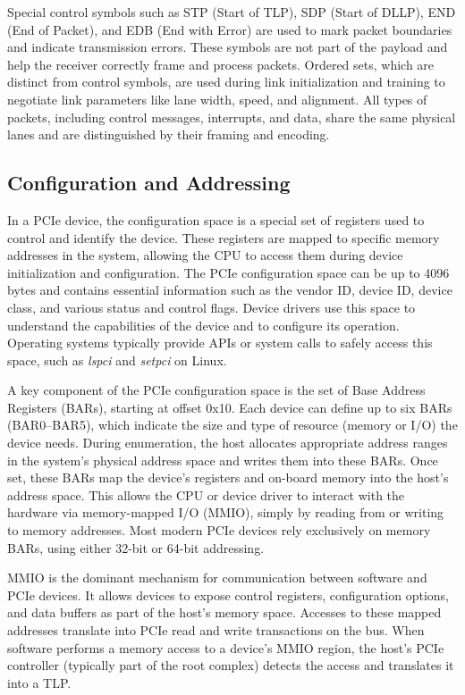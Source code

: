 Special control symbols such as STP (Start of TLP), SDP (Start of DLLP), END (End of Packet), and EDB (End with Error) are used to mark packet boundaries and indicate transmission errors. These symbols are not part of the payload and help the receiver correctly frame and process packets. Ordered sets, which are distinct from control symbols, are used during link initialization and training to negotiate link parameters like lane width, speed, and alignment. All types of packets, including control messages, interrupts, and data, share the same physical lanes and are distinguished by their framing and encoding.

\subsection{Configuration and Addressing}

In a PCIe device, the configuration space is a special set of registers used to control and identify the device. These registers are mapped to specific memory addresses in the system, allowing the CPU to access them during device initialization and configuration. The PCIe configuration space can be up to 4096 bytes and contains essential information such as the vendor ID, device ID, device class, and various status and control flags. Device drivers use this space to understand the capabilities of the device and to configure its operation. Operating systems typically provide APIs or system calls to safely access this space, such as \textit{lspci} and \textit{setpci} on Linux.

A key component of the PCIe configuration space is the set of Base Address Registers (BARs), starting at offset 0x10. Each device can define up to six BARs (BAR0–BAR5), which indicate the size and type of resource (memory or I/O) the device needs. During enumeration, the host allocates appropriate address ranges in the system’s physical address space and writes them into these BARs. Once set, these BARs map the device’s registers and on-board memory into the host’s address space. This allows the CPU or device driver to interact with the hardware via memory-mapped I/O (MMIO), simply by reading from or writing to memory addresses. Most modern PCIe devices rely exclusively on memory BARs, using either 32-bit or 64-bit addressing.

MMIO is the dominant mechanism for communication between software and PCIe devices. It allows devices to expose control registers, configuration options, and data buffers as part of the host’s memory space. Accesses to these mapped addresses translate into PCIe read and write transactions on the bus. When software performs a memory access to a device’s MMIO region, the host’s PCIe controller (typically part of the root complex) detects the access and translates it into a TLP.

